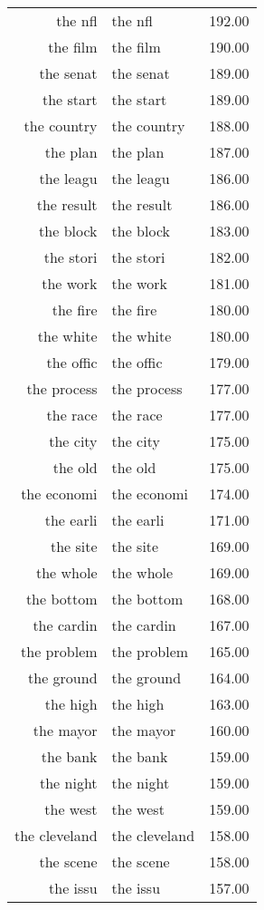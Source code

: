 \begin{table}[ht]
\begin{tabular}{rlr}
  the nfl & the nfl & 192.00 \\ 
  the film & the film & 190.00 \\ 
  the senat & the senat & 189.00 \\ 
  the start & the start & 189.00 \\ 
  the country & the country & 188.00 \\ 
  the plan & the plan & 187.00 \\ 
  the leagu & the leagu & 186.00 \\ 
  the result & the result & 186.00 \\ 
  the block & the block & 183.00 \\ 
  the stori & the stori & 182.00 \\ 
  the work & the work & 181.00 \\ 
  the fire & the fire & 180.00 \\ 
  the white & the white & 180.00 \\ 
  the offic & the offic & 179.00 \\ 
  the process & the process & 177.00 \\ 
  the race & the race & 177.00 \\ 
  the city & the city & 175.00 \\ 
  the old & the old & 175.00 \\ 
  the economi & the economi & 174.00 \\ 
  the earli & the earli & 171.00 \\ 
  the site & the site & 169.00 \\ 
  the whole & the whole & 169.00 \\ 
  the bottom & the bottom & 168.00 \\ 
  the cardin & the cardin & 167.00 \\ 
  the problem & the problem & 165.00 \\ 
  the ground & the ground & 164.00 \\ 
  the high & the high & 163.00 \\ 
  the mayor & the mayor & 160.00 \\ 
  the bank & the bank & 159.00 \\ 
  the night & the night & 159.00 \\ 
  the west & the west & 159.00 \\ 
  the cleveland & the cleveland & 158.00 \\ 
  the scene & the scene & 158.00 \\ 
  the issu & the issu & 157.00 \\ 

\end{tabular}
\end{table}

